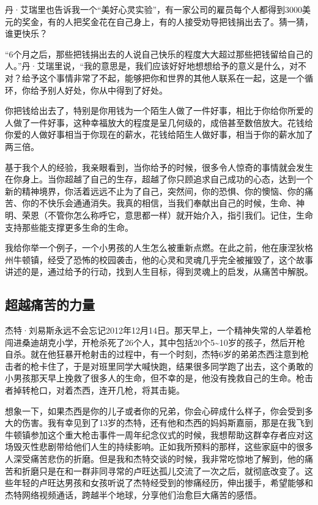 丹·艾瑞里也告诉我一个“美好心灵实验”，有一家公司的雇员每个人都得到3000美元的奖金，有的人把奖金花在自己身上，有的人接受劝导把钱捐出去了。猜一猜，谁更快乐？

“6个月之后，那些把钱捐出去的人说自己快乐的程度大大超过那些把钱留给自己的人。”丹·艾瑞里说，“我的意思是，我们应该好好地想想给予的意义是什么，对不对？给予这个事情非常了不起，能够把你和世界的其他人联系在一起，这是一个循环，你给予别人好处，你从中得到了好处。

你把钱给出去了，特别是你用钱为一个陌生人做了一件好事，相比于你给你所爱的人做了一件好事，这种幸福放大的程度是呈几何级的，成倍甚至数倍放大。花钱给你爱的人做好事相当于你现在的薪水，花钱给陌生人做好事，相当于你的薪水加了两三倍。

基于我个人的经验，我亲眼看到，当你给予的时候，很多令人惊奇的事情就会发生在你身上。当你超越了自己的生存，超越了你只顾追求自己成功的心态，达到一个新的精神境界，你活着远远不止为了自己，突然间，你的恐惧、你的懊恼、你的痛苦、你的不快乐会通通消失。我真的相信，当我们奉献出自己的时候，生命、神明、荣恩（不管你怎么称呼它，意思都一样）就开始介入，指引我们。记住，生命支持那些能支撑更多生命的生命。

我给你举一个例子，一个小男孩的人生怎么被重新点燃。在此之前，他在康涅狄格州牛顿镇，经受了恐怖的校园袭击，他的心灵和灵魂几乎完全被摧毁了，这个故事讲述的是，通过给予的行动，找到人生目标，得到灵魂上的启发，从痛苦中解脱。

\subsection{超越痛苦的力量}

杰特·刘易斯永远不会忘记2012年12月14日。那天早上，一个精神失常的人举着枪闯进桑迪胡克小学，开枪杀死了26个人，其中包括20个5\textasciitilde{}10岁的孩子，然后开枪自杀。就在他狂暴开枪射击的过程中，有一个时刻，杰特6岁的弟弟杰西注意到枪击者的枪卡住了，于是对班里同学大喊快跑，结果很多同学跑了出去，这个勇敢的小男孩那天早上挽救了很多人的生命，但不幸的是，他没有挽救自己的生命。枪击者掉转枪口，对着杰西，连开几枪，将其击毙。

想象一下，如果杰西是你的儿子或者你的兄弟，你会心碎成什么样子，你会受到多大的伤害。我有幸见到了13岁的杰特，还有他和杰西的妈妈斯嘉丽，那是在我飞到牛顿镇参加这个重大枪击事件一周年纪念仪式的时候，我想帮助这群幸存者应对这场毁灭性悲剧带给他们人生的持续影响。正如我所预料的那样，这些家庭中的很多人深受痛苦悲伤的折磨。但是我和杰特交谈的时候，我非常吃惊地了解到，他的痛苦和折磨只是在和一群非同寻常的卢旺达孤儿交流了一次之后，就彻底改变了。这些年轻的卢旺达男孩和女孩听说了杰特经受到的惨痛经历，伸出援手，希望能够和杰特网络视频通话，跨越半个地球，分享他们治愈巨大痛苦的感悟。

